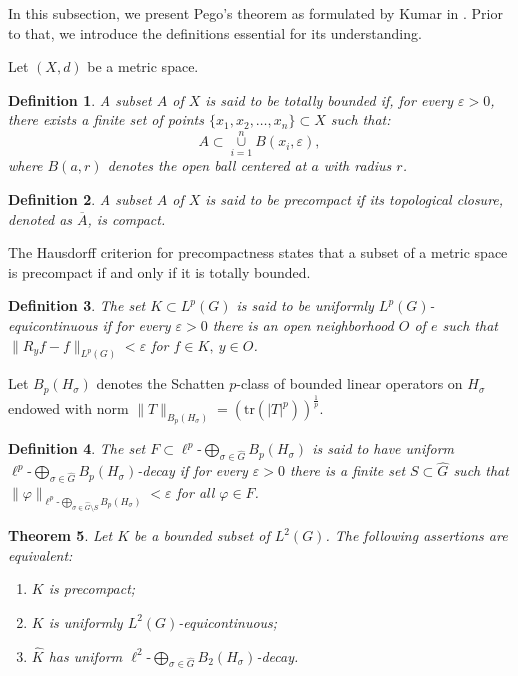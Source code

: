 \documentclass[10pt,a4paper]{amsart}
\newtheorem{theorem}{Theorem}[section]
\newtheorem{definition}[theorem]{Definition}
\def\union{\mathop{\cup }}
\def\petitoplus{\mathop{\bigoplus}}
\begin{document}
In this subsection, we present Pego's theorem as formulated by Kumar in \cite{Kumar2024}. Prior to that, we introduce the definitions essential for its understanding.

Let $(X, d)$ be a metric space.
\begin{definition}
A subset $A$ of $X$ is said to be  {totally bounded} if, for every $\varepsilon > 0$, there exists a finite set of points $\{x_1, x_2, \dots, x_n\} \subset X$ such that:
$$
A \subset \union\limits_{i=1}^{n} B(x_i, \varepsilon),
$$
where $B(a,r)$ denotes the open ball centered at $a$ with radius $r$.
\end{definition}
\begin{definition}
A subset $A$ of $X$ is said to be {precompact} if its topological closure, denoted as $\overline{A}$, is compact.
\end{definition}

\noindent The Hausdorff criterion for precompactness states that a subset of a metric space is precompact if and only if it is totally bounded. 

\begin{definition}
The set $K\subset L^p(G)$ is said to be uniformly $L^p(G)$-equicontinuous if for every
$\varepsilon>0$ there is an open neighborhood $O$ of $e$ such that $\|R_yf-f\|_{L^p(G)}<\varepsilon$
for $f\in K,\ y\in O$.
\end{definition}


Let $B_p(H_\sigma)$ denotes   the Schatten $p$-class of bounded linear operators on $H_\sigma$ endowed with norm  $\|T\|_{B_p(H_\sigma)}=\left(\text{tr}(|T|^p)\right)^{\frac{1}{p}}$.

\begin{definition}
The set $F\subset\ell^p\text{-}\petitoplus\limits_{\sigma\in \widehat{G}} B_p(H_\sigma)$ is said to have uniform
$\ell^p\text{-}\petitoplus\limits_{\sigma\in \widehat{G}} B_p(H_\sigma)$-decay if for every $\varepsilon>0$ there
is a finite set $S\subset\widehat{G}$ such that  $\|\varphi\|_{\ell^p\text{-}\petitoplus_{\sigma \in \widehat{G}\setminus S}B_p(H_\sigma)}<\varepsilon$ for all $\varphi\in F$. 

\end{definition}

\begin{theorem} \cite[Theorem 1.1]{Kumar2024}\label{thm:kumar}
Let $K$ be a bounded subset of $L^2(G)$. The following assertions are equivalent:
\begin{enumerate}
\item[(i)] $K$
is precompact;
\item[(ii)] $K$ is uniformly $L^2(G)$-equicontinuous;
\item[(iii)] $\widehat K$ has uniform $\ell^2\text{-}\petitoplus\limits_{\sigma \in \widehat{G}} B_2(H_\sigma)$-decay.
\end{enumerate}
\end{theorem}
\end{document}
